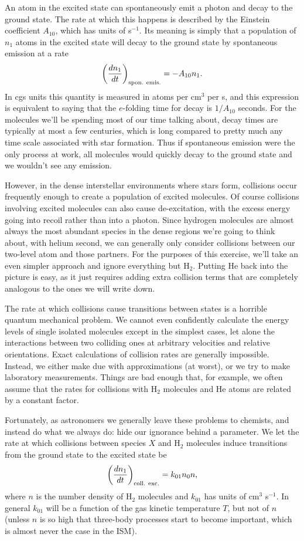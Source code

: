An atom in the excited state can spontaneously emit a photon and decay to the ground state. The rate at which this happens is described by the Einstein coefficient $A_{10}$, which has units of s$^{-1}$. Its meaning is simply that a population of $n_1$ atoms in the excited state will decay to the ground state by spontaneous emission at a rate 
\begin{equation}
\left(\frac{dn_1}{dt}\right)_{\rm spon.~emis.} = -A_{10} n_1.
\end{equation}
In cgs units this quantity is measured in atoms per cm$^3$ per s, and this expression is equivalent to saying that the $e$-folding time for decay is $1/A_{10}$ seconds. For the molecules we'll be spending most of our time talking about, decay times are typically at most a few centuries, which is long compared to pretty much any time scale associated with star formation. Thus if spontaneous emission were the only process at work, all molecules would quickly decay to the ground state and we wouldn't see any emission.

However, in the dense interstellar environments where stars form, collisions occur frequently enough to create a population of excited molecules. Of course collisions involving excited molecules can also cause de-excitation, with the excess energy going into recoil rather than into a photon. Since hydrogen molecules are almost always the most abundant species in the dense regions we're going to think about, with helium second, we can generally only consider collisions between our two-level atom and those partners. For the purposes of this exercise, we'll take an even simpler approach and ignore everything but H$_2$. Putting He back into the picture is easy, as it just requires adding extra collision terms that are completely analogous to the ones we will write down.

The rate at which collisions cause transitions between states is a horrible quantum mechanical problem. We cannot even confidently calculate the energy levels of single isolated molecules except in the simplest cases, let alone the interactions between two colliding ones at arbitrary velocities and relative orientations. Exact calculations of collision rates are generally impossible. Instead, we either make due with approximations (at worst), or we try to make laboratory measurements. Things are bad enough that, for example, we often assume that the rates for collisions with H$_2$ molecules and He atoms are related by a constant factor.

Fortunately, as astronomers we generally leave these problems to chemists, and instead do what we always do: hide our ignorance behind a parameter. We let the rate at which collisions between species $X$ and H$_2$ molecules induce transitions from the ground state to the excited state be
\begin{equation}
\left(\frac{dn_1}{dt}\right)_{\rm coll.~exc.} = k_{01} n_0 n,
\end{equation}
where $n$ is the number density of H$_2$ molecules and $k_{01}$ has units of cm$^3$ s$^{-1}$. In general $k_{01}$ will be a function of the gas kinetic temperature $T$, but not of $n$ (unless $n$ is so high that three-body processes start to become important, which is almost never the case in the ISM). 

